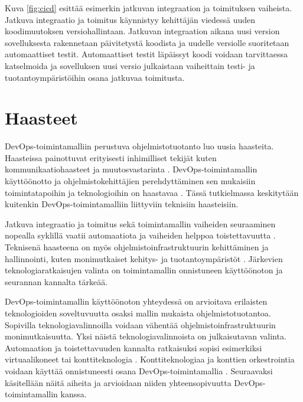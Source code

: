 Kuva \ref{fig:cicd} esittää esimerkin jatkuvan integraation ja toimituksen vaiheista.
Jatkuva integraatio ja toimitus käynnistyy kehittäjän viedessä uuden koodimuutoksen versiohallintaan.
Jatkuvan integraation aikana uusi version sovelluksesta rakennetaan päivitetystä koodista ja uudelle versiolle suoritetaan automaattiset testit.
Automaattiset testit läpäissyt koodi voidaan tarvittaessa katselmoida ja sovelluksen uusi versio julkaistaan vaiheittain testi- ja tuotantoympäristöihin osana jatkuvaa toimitusta.

\section{Haasteet}

DevOps-toimintamalliin perustuva ohjelmistotuotanto luo uusia haasteita.
Haasteissa painottuvat erityisesti inhimilliset tekijät kuten kommunikaatiohaasteet ja muutosvastarinta \cite{Kalliosaari16}.
DevOps-toimintamallin käyttöönotto ja ohjelmistokehittäjien perehdyttäminen sen mukaisiin toimintatapoihin ja teknologioihin on haastavaa \cite{Leite19}.
Tässä tutkielmassa keskitytään kuitenkin DevOps-toimintamalliin liittyviin teknisiin haasteisiin.

Jatkuva integraatio ja toimitus sekä toimintamallin vaiheiden seuraaminen nopealla syklillä vaatii automaatiota ja vaiheiden helppoa toistettavuutta \cite{Jabbari16, Leite19}.
Teknisenä haasteena on myös ohjelmistoinfrastruktuurin kehittäminen ja hallinnointi, kuten monimutkaiset kehitys- ja tuotantoympäristöt \cite{Khan22, Kalliosaari16}.
Järkevien teknologiaratkaisujen valinta on toimintamallin onnistuneen käyttöönoton ja seurannan kannalta tärkeää.

DevOps-toimintamallin käyttöönoton yhteydessä on arvioitava erilaisten teknologioiden soveltuvuutta osaksi mallin mukaista ohjelmistotuotantoa.
Sopivilla teknologiavalinnoilla voidaan vähentää ohjelmistoinfrastruktuurin monimutkaisuutta.
Yksi näistä teknologiavalinnoista on julkaisutavan valinta.
Automaation ja toistettavuuden kannalta ratkaisuksi sopisi esimerkiksi virtuaalikoneet tai konttiteknologia \cite{Dua14}.
Konttiteknologiaa ja konttien orkestrointia voidaan käyttää onnistuneesti osana DevOps-toimintamallia \mbox{\cite{Kang16, Narasimhulu23}}.
Seuraavaksi käsitellään näitä aiheita ja arvioidaan niiden yhteensopivuutta DevOps-toimintamallin kanssa.

